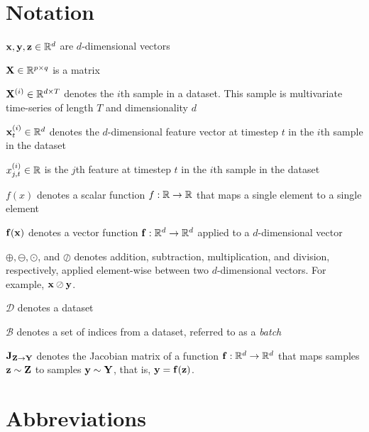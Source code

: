 \documentclass{statsmsc}
\begin{document}
{\chapter*{Notation}\thispagestyle{plain}
    $\mathbf{x}, \mathbf{y}, \mathbf{z}\in\mathbb{R}^d$ are $d$-dimensional vectors

    $\mathbf{X} \in \mathbb{R}^{p \times q}$ is a matrix

    $\mathbf{X}^{(i)} \in \mathbb{R}^{d \times T}$ denotes the $i$th sample in a dataset. This sample is multivariate time-series of length $T$ and dimensionality $d$

    $\mathbf{x}^{(i)}_t \in \mathbb{R}^d$ denotes the $d$-dimensional feature vector at timestep $t$ in the $i$th sample in the dataset

    $x^{(i)}_{j,t}\in\mathbb{R}$ is the $j$th feature at timestep $t$ in the $i$th sample in the dataset

    $f(x)$ denotes a scalar function $f: \mathbb{R} \rightarrow {\mathbb{R}}$ that maps a single element to a single element

    $\mathbf{f}(\mathbf{x})$ denotes a vector function $\mathbf{f}:\mathbb{R}^d \rightarrow {\mathbb{R}^d}$ applied to a $d$-dimensional vector

    $\oplus, \ominus, \odot$, and $\oslash$ denotes addition, subtraction, multiplication, and division, respectively, applied element-wise between two $d$-dimensional vectors. For example, $\mathbf{x} \oslash \mathbf{y}$.

    $\mathcal{D}$ denotes a dataset

    $\mathcal{B}$ denotes a set of indices from a dataset, referred to as a \textit{batch}

    $\mathbf{J}_{\mathbf{Z} \rightarrow {\mathbf{Y}}}$ denotes the Jacobian matrix of a function $\mathbf{f} : \mathbb{R}^d \rightarrow {\mathbb{R}^d}$ that maps samples $\mathbf{z} \sim \mathbf{Z}$ to samples $\mathbf{y} \sim \mathbf{Y}$, that is,
    $\mathbf{y}=\mathbf{f}(\mathbf{z})$.


{\chapter*{Abbreviations}\thispagestyle{plain}
    \begin{acronym}[TDMA]
    \end{acronym}
}

}
\end{document}
